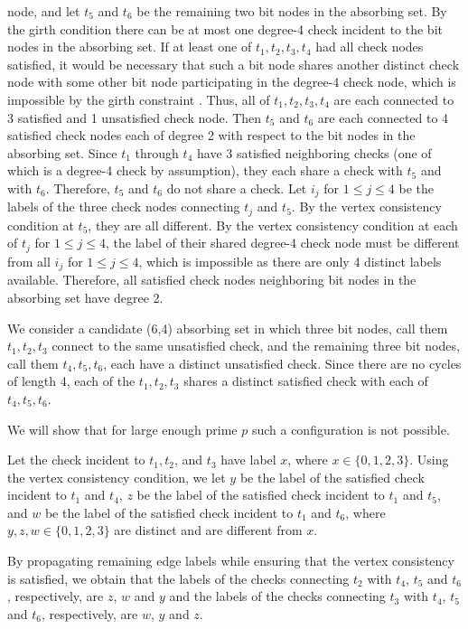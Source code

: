 node, and let $t_5$ and $t_6$ be the remaining two bit nodes in
the absorbing set. By the girth condition there can be at most one
degree-4 check incident to the bit nodes in the absorbing set. If
at least one of $t_1, t_2,t_3,t_4$ had all check nodes satisfied,
it would be necessary that such a bit node shares another distinct
check node with some other bit node participating in the degree-4
check node, which is impossible by the girth constraint
\cite{fan}. Thus, all of $t_1, t_2,t_3,t_4$ are each connected to
3 satisfied and 1 unsatisfied check node. Then $t_5$ and $t_6$ are
each connected to 4 satisfied check nodes each of degree 2 with
respect to the bit nodes in the absorbing set. Since $t_1$ through
$t_4$ have 3 satisfied neighboring checks (one of which is a
degree-4 check by assumption), they each share a check with $t_5$
and with $t_6$. Therefore, $t_5$ and $t_6$ do not share a check.
Let $i_j$ for $1 \leq j \leq 4$ be the labels of the three check
nodes connecting $t_j$ and $t_5$. By the vertex consistency
condition at $t_5$, they are all different. By the vertex
consistency condition at each of $t_j$ for $1 \leq j \leq 4$, the
label of their shared degree-4 check node must be different from
all $i_j$ for $1 \leq j \leq 4$, which is impossible as there are
only 4 distinct labels available. Therefore, all satisfied check
nodes neighboring bit nodes in the absorbing set have degree 2.

We consider a candidate (6,4) absorbing set in which three bit
nodes, call them $t_1,t_2,t_3$ connect to the same unsatisfied
check, and the remaining three bit nodes, call them $t_4,t_5,t_6$,
each have a distinct unsatisfied check. Since there are no cycles
of length 4, each of the $t_1,t_2,t_3$ shares a distinct satisfied
check with each of $t_4,t_5,t_6$.

We will show that for large enough prime $p$ such a configuration
is not possible.

Let the check incident to $t_1,t_2$, and $t_3$ have label $x$,
where $x \in \{0,1,2,3\}$. Using the vertex consistency condition,
we let $y$ be the label of the satisfied check incident to $t_1$
and $t_4$, $z$ be the label of the satisfied check incident to
$t_1$ and $t_5$, and $w$ be the label of the satisfied check
incident to $t_1$ and $t_6$, where $y,z,w \in \{0,1,2,3\}$ are
distinct and are different from $x$.

By propagating remaining edge labels while ensuring that the
vertex consistency is satisfied, we obtain that the labels of the
checks connecting $t_2$ with $t_4$, $t_5$  and $t_6$,
respectively, are $z$, $w$ and $y$ and the labels of the checks
connecting $t_3$ with $t_4$, $t_5$  and $t_6$, respectively, are
$w$, $y$ and $z$.

